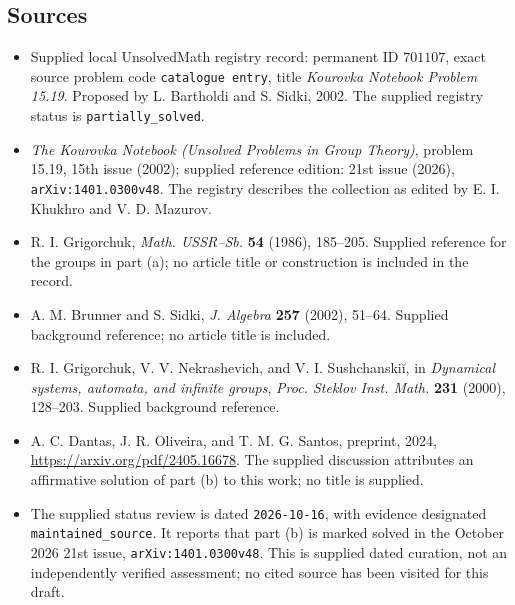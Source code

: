 \documentclass[11pt]{article}
\begin{document}
\subsection{Sources}
\begin{itemize}
\item Supplied local UnsolvedMath registry record: permanent ID \(701107\), exact source problem code \texttt{catalogue entry}, title \emph{Kourovka Notebook Problem 15.19}. Proposed by L. Bartholdi and S. Sidki, 2002. The supplied registry status is \texttt{partially\_solved}.
\item \emph{The Kourovka Notebook (Unsolved Problems in Group Theory)}, problem 15.19, 15th issue (2002); supplied reference edition: 21st issue (2026), \texttt{arXiv:1401.0300v48}. The registry describes the collection as edited by E. I. Khukhro and V. D. Mazurov.
\item R. I. Grigorchuk, \emph{Math. USSR--Sb.} \textbf{54} (1986), 185--205. Supplied reference for the groups in part (a); no article title or construction is included in the record.
\item A. M. Brunner and S. Sidki, \emph{J. Algebra} \textbf{257} (2002), 51--64. Supplied background reference; no article title is included.
\item R. I. Grigorchuk, V. V. Nekrashevich, and V. I. Sushchanskiĭ, in \emph{Dynamical systems, automata, and infinite groups}, \emph{Proc. Steklov Inst. Math.} \textbf{231} (2000), 128--203. Supplied background reference.
\item A. C. Dantas, J. R. Oliveira, and T. M. G. Santos, preprint, 2024, \url{https://arxiv.org/pdf/2405.16678}. The supplied discussion attributes an affirmative solution of part (b) to this work; no title is supplied.
\item The supplied status review is dated \texttt{2026-10-16}, with evidence designated \texttt{maintained\_source}. It reports that part (b) is marked solved in the October 2026 21st issue, \texttt{arXiv:1401.0300v48}. This is supplied dated curation, not an independently verified assessment; no cited source has been visited for this draft.
\end{itemize}
\end{document}
